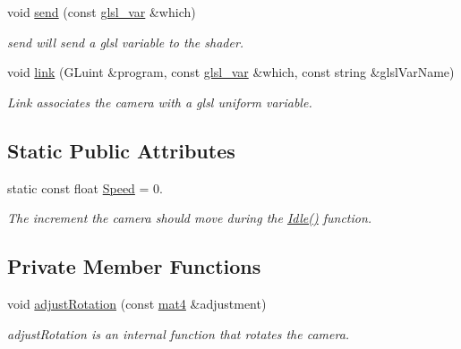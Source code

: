 \begin{DoxyCompactItemize}
void \hyperlink{class_camera_a36cba68c08136242bf5d906f9c0b610c}{send} (const \hyperlink{class_camera_a6ff726a75a430e4f17e5dec42e4d4405}{glsl\-\_\-var} \&which)
\begin{DoxyCompactList}\small\item\em send will send a glsl variable to the shader. \end{DoxyCompactList}\item 
void \hyperlink{class_camera_ab7574214240c67ca774255ef1d7616de}{link} (\-G\-Luint \&program, const \hyperlink{class_camera_a6ff726a75a430e4f17e5dec42e4d4405}{glsl\-\_\-var} \&which, const string \&glsl\-Var\-Name)
\begin{DoxyCompactList}\small\item\em \-Link associates the camera with a glsl uniform variable. \end{DoxyCompactList}\end{DoxyCompactItemize}
\subsection*{\-Static \-Public \-Attributes}
\begin{DoxyCompactItemize}
\item 
static const float \hyperlink{class_camera_aedf8ba8b2af631a5a3e33b19bfa40322}{\-Speed} = 0.
\begin{DoxyCompactList}\small\item\em \-The increment the camera should move during the \hyperlink{class_camera_aec3559fe43597656629fdb00157d3c73}{\-Idle()} function. \end{DoxyCompactList}\end{DoxyCompactItemize}
\subsection*{\-Private \-Member \-Functions}
\begin{DoxyCompactItemize}
\item 
void \hyperlink{class_camera_a7ffc3619f9a5d8e586cb3d96ebdd3188}{adjust\-Rotation} (const \hyperlink{class_angel_1_1mat4}{mat4} \&adjustment)
\begin{DoxyCompactList}\small\item\em adjust\-Rotation is an internal function that rotates the camera. \end{DoxyCompactList}\end{DoxyCompactItemize}
